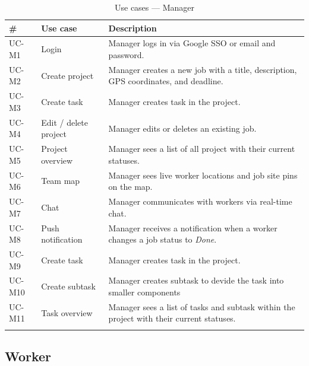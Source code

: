 \begin{longtable}{p{}p{}p{}}
  \toprule
  \textbf{\#} & \textbf{Use case} & \textbf{Description} \\
  \midrule
  \endhead
  UC-M1 & Login           & Manager logs in via Google SSO or email and password. \\
  UC-M2 & Create project      & Manager creates a new job with a title, description, GPS coordinates, and deadline. \\
  UC-M3 & Create task & Manager creates task in the project. \\
  UC-M4 & Edit / delete project & Manager edits or deletes an existing job. \\
  UC-M5 & Project overview    & Manager sees a list of all project with their current statuses. \\
  UC-M6 & Team map        & Manager sees live worker locations and job site pins on the map. \\
  UC-M7 & Chat            & Manager communicates with workers via real-time chat. \\
  UC-M8 & Push notification & Manager receives a notification when a worker changes a job status to \textit{Done}. \\
  UC-M9 & Create task & Manager creates task in the project. \\
  UC-M10 & Create subtask & Manager creates subtask to devide the task into smaller components\\
  UC-M11 & Task overview    & Manager sees a list of tasks and subtask within the project with their current statuses. \\
  \bottomrule
  \caption{Use cases --- Manager}
\end{longtable}

\subsection{Worker}


